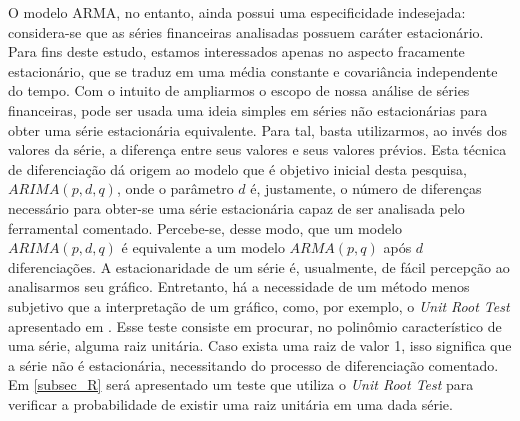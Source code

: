 \documentclass[12pt]{article}
\begin{document}
O modelo ARMA, no entanto, ainda possui uma especificidade indesejada: considera-se
que as séries financeiras analisadas possuem caráter estacionário. Para fins deste estudo,
estamos interessados apenas no aspecto fracamente estacionário, que se traduz em uma
média constante e covariância independente do tempo.
Com o intuito de ampliarmos o escopo de nossa análise de séries financeiras, pode ser
usada uma ideia simples em séries não estacionárias para obter uma série estacionária
equivalente. Para tal, basta utilizarmos, ao invés dos valores da série, a diferença entre seus
valores e seus valores prévios. Esta técnica de diferenciação dá origem ao modelo que é
objetivo inicial desta pesquisa, $ARIMA(p,d,q)$, onde o parâmetro $d$ é, justamente, o número de
diferenças necessário para obter-se uma série estacionária capaz de ser analisada pelo
ferramental comentado. Percebe-se, desse modo, que um modelo $ARIMA(p,d,q)$ é
equivalente a um modelo $ARMA(p,q)$ após $d$ diferenciações. A estacionaridade de um série é, usualmente, de fácil percepção ao analisarmos seu gráfico. Entretanto, há a necessidade de um método menos subjetivo que a interpretação de um gráfico, como, por exemplo, o \emph{Unit Root Test} apresentado em \cite{Tsay}. Esse teste consiste em procurar, no polinômio característico de uma série, alguma raiz unitária. Caso exista uma raiz de valor 1, isso significa que a série não é estacionária, necessitando do processo de diferenciação comentado. Em \ref{subsec_R} será apresentado um teste que utiliza o \emph{Unit Root Test} para verificar a probabilidade de existir uma raiz unitária em uma dada série.
\end{document}
